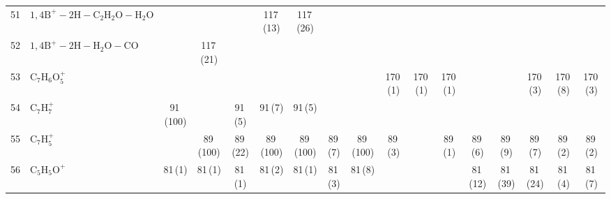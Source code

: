 \documentclass[]{article}
\begin{document}
\begin{table}
{\begin{tabular}{ll|ccccc|ccccc|ccccc}
  51 & $\mathrm{1{,}4B^+{-}2H{-}C_{2}H_{2}O{-}H_{2}O}$ &  &  &  & 117\,(13) & 117\,(26) &  &  &  &  &  &  &  &  &  &  \\ 
  52 & $\mathrm{1{,}4B^+{-}2H{-}H_{2}O{-}CO}$ &  & 117\,(21) &  &  &  &  &  &  &  &  &  &  &  &  &  \\ 
  53 & $\mathrm{C_{7}H_{6}O_{5}^+}$ &  &  &  &  &  &  &  & 170\,(1) & 170\,(1) & 170\,(1) &  &  & 170\,(3) & 170\,(8) & 170\,(3) \\ 
  54 & $\mathrm{C_{7}H_{7}^+}$ & 91\,(100) &  & 91\,(5) & 91\,(7) & 91\,(5) &  &  &  &  &  &  &  &  &  &  \\ 
  55 & $\mathrm{C_{7}H_{5}^+}$ &  & 89\,(100) & 89\,(22) & 89\,(100) & 89\,(100) & 89\,(7) & 89\,(100) & 89\,(3) &  & 89\,(1) & 89\,(6) & 89\,(9) & 89\,(7) & 89\,(2) & 89\,(2) \\ 
  56 & $\mathrm{C_{5}H_{5}O^+}$ & 81\,(1) & 81\,(1) & 81\,(1) & 81\,(2) & 81\,(1) & 81\,(3) & 81\,(8) &  &  &  & 81\,(12) & 81\,(39) & 81\,(24) & 81\,(4) & 81\,(7) \\ 
   \bottomrule
\end{tabular}
}
\end{table}

\qquad

\setlength\tabcolsep{1.5pt}
\end{document}
